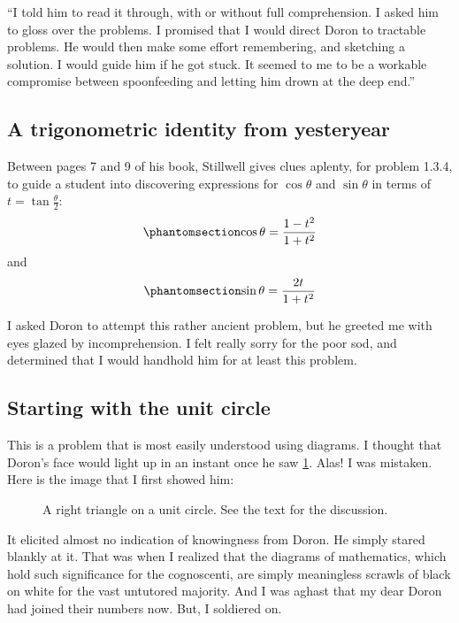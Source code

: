 \documentclass[
  a4paper,
]{article}
\begin{document}
``I told him to read it through, with or without full comprehension. I
asked him to gloss over the problems. I promised that I would direct
Doron to tractable problems. He would then make some effort remembering,
and sketching a solution. I would guide him if he got stuck. It seemed
to me to be a workable compromise between spoonfeeding and letting him
drown at the deep end.''

\subsection{A trigonometric identity from
yesteryear}\label{a-trigonometric-identity-from-yesteryear}

Between pages 7 and 9 of his book, Stillwell gives clues aplenty, for
problem 1.3.4, to guide a student into discovering expressions for
\(\cos\theta\) and \(\sin\theta\) in terms of
\(t = \tan\frac{\theta}{2}\):
\begin{equation}\phantomsection\label{eq:costheta}{
\cos\theta = \frac{1 - t^2}{1 + t^2}
}\end{equation} and \begin{equation}\phantomsection\label{eq:sintheta}{
\sin\theta = \frac{2t}{1 + t^2}
}\end{equation}

I asked Doron to attempt this rather ancient problem, but he greeted me
with eyes glazed by incomprehension. I felt really sorry for the poor
sod, and determined that I would handhold him for at least this problem.

\subsection{Starting with the unit
circle}\label{starting-with-the-unit-circle}

This is a problem that is most easily understood using diagrams. I
thought that Doron's face would light up in an instant once he saw
\cref{fig:pythagoras}. Alas! I was mistaken. Here is the image that I
first showed him:

\begin{figure}
\centering

\caption{A right triangle on a unit circle. See the text for the
discussion.}\label{fig:pythagoras}
\end{figure}

It elicited almost no indication of knowingness from Doron. He simply
stared blankly at it. That was when I realized that the diagrams of
mathematics, which hold such significance for the cognoscenti, are
simply meaningless scrawls of black on white for the vast untutored
majority. And I was aghast that my dear Doron had joined their numbers
now. But, I soldiered on.
\end{document}
